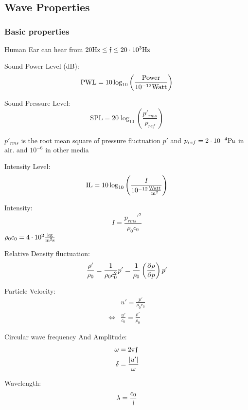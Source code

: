 \documentclass[main.tex]{subfiles}
\begin{document}
\subsection{Wave Properties}

\subsubsection{Basic properties}
Human Ear can hear from $20 \text{Hz} \leq \mathfrak{f} \leq 20\cdot 10^{3} \text{Hz}$

Sound Power Level (dB):
\begin{equation}
    \text{PWL} = 10\log_{10}\left(\frac{\text{Power}}{10^{-12}\text{Watt}}\right)
    \label{eq:PWL}
\end{equation}

Sound Pressure Level:
\begin{equation}
    \text{SPL} = 20\log_{10}\left(\frac{p'_{rms}}{p_{ref}}\right)
    \label{eq:SPL}  
\end{equation}

$p'_{rms}$ is the root mean square of pressure fluctuation $p'$ and $p_{ref} = 2\cdot 10^{-4}\text{Pa}$ in air. and $10^{-6}$ in other media

Intensity Level:
\begin{equation}
    \text{IL} = 10\log_{10}\left(\frac{I}{10^{-12}\frac{\text{Watt}}{\text{m}^2}}\right) 
    \label{eq:IL}
\end{equation}

Intensity:
\begin{equation}
    I = \frac{p_{rms}'^2}{\rho_0c_0}
    \label{eq:Intesity}
\end{equation}
$\rho_0 c_0 = 4\cdot 10^{2}\frac{\text{kg}}{\text{m}^2 \text{s}}$ 

Relative Density fluctuation:
\begin{equation}
    \frac{\rho'}{\rho_0} = \frac{1}{\rho_0 c_0^2}p' = \frac{1}{\rho_0}\left(\frac{\partial \rho}{\partial p}\right)p'
    \label{eq: Density fluctuation}
\end{equation}

Particle Velocity:
\begin{align}
    &u' = \frac{p'}{\rho_0 c_0} \label{eq:part_velo}\\
    \iff &\frac{u'}{c_0} = \frac{\rho'}{\rho_0} \nonumber
\end{align}

Circular wave frequency And Amplitude:
\begin{align}
    \omega &= 2\pi \mathfrak{f} \label{eq:circ_freq}\\
    \delta &= \frac{|u'|}{\omega} \label{eq:amplitude}
\end{align}

Wavelength:
\begin{equation}
    \lambda = \frac{c_0}{\mathfrak{f}}
\end{equation}
\end{document}
